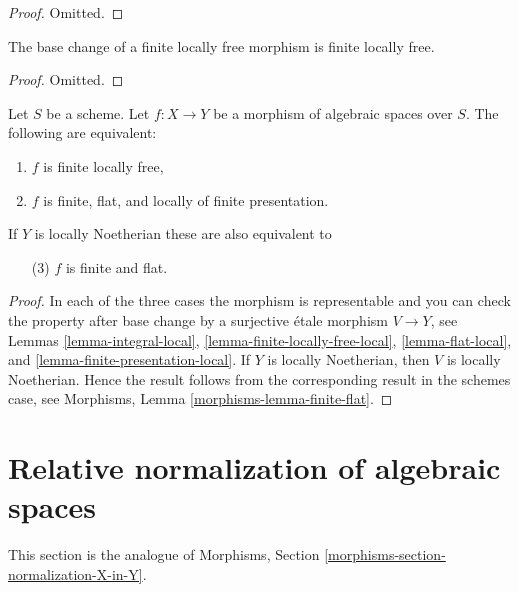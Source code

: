 \begin{proof}
Omitted.
\end{proof}

\begin{lemma}
\label{lemma-base-change-finite-locally-free}
The base change of a finite locally free morphism is finite locally free.
\end{lemma}

\begin{proof}
Omitted.
\end{proof}

\begin{lemma}
\label{lemma-finite-flat}
Let $S$ be a scheme.
Let $f : X \to Y$ be a morphism of algebraic spaces over $S$.
The following are equivalent:
\begin{enumerate}
\item $f$ is finite locally free,
\item $f$ is finite, flat, and locally of finite presentation.
\end{enumerate}
If $Y$ is locally Noetherian these are also equivalent to
\begin{enumerate}
\item[(3)] $f$ is finite and flat.
\end{enumerate}
\end{lemma}

\begin{proof}
In each of the three cases the morphism is representable and you
can check the property after base change by a surjective \'etale morphism
$V \to Y$, see
Lemmas \ref{lemma-integral-local},
\ref{lemma-finite-locally-free-local},
\ref{lemma-flat-local}, and
\ref{lemma-finite-presentation-local}.
If $Y$ is locally Noetherian, then $V$ is locally Noetherian.
Hence the result follows from the corresponding result
in the schemes case, see
Morphisms, Lemma \ref{morphisms-lemma-finite-flat}.
\end{proof}







\section{Relative normalization of algebraic spaces}
\label{section-normalization-X-in-Y}

\noindent
This section is the analogue of
Morphisms, Section \ref{morphisms-section-normalization-X-in-Y}.

